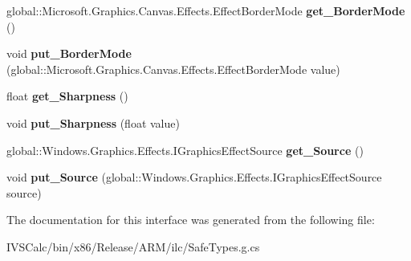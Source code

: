 \begin{DoxyCompactItemize}
global\+::\+Microsoft.\+Graphics.\+Canvas.\+Effects.\+Effect\+Border\+Mode {\bfseries get\+\_\+\+Border\+Mode} ()
\item 
\mbox{\label{interface_microsoft_1_1_graphics_1_1_canvas_1_1_effects_1_1_i_scale_effect_a56c46fac62fdf0f627612c3363b495f4}} 
void {\bfseries put\+\_\+\+Border\+Mode} (global\+::\+Microsoft.\+Graphics.\+Canvas.\+Effects.\+Effect\+Border\+Mode value)
\item 
\mbox{\label{interface_microsoft_1_1_graphics_1_1_canvas_1_1_effects_1_1_i_scale_effect_a76ce1ef01a06978e684a4618f550223f}} 
float {\bfseries get\+\_\+\+Sharpness} ()
\item 
\mbox{\label{interface_microsoft_1_1_graphics_1_1_canvas_1_1_effects_1_1_i_scale_effect_afab0f505adbbffee701a263c3e62fe43}} 
void {\bfseries put\+\_\+\+Sharpness} (float value)
\item 
\mbox{\label{interface_microsoft_1_1_graphics_1_1_canvas_1_1_effects_1_1_i_scale_effect_a5d893ef5b6101520f8cfba14fe6da905}} 
global\+::\+Windows.\+Graphics.\+Effects.\+I\+Graphics\+Effect\+Source {\bfseries get\+\_\+\+Source} ()
\item 
\mbox{\label{interface_microsoft_1_1_graphics_1_1_canvas_1_1_effects_1_1_i_scale_effect_ad103c9b390384b145ae6c1e98f30522e}} 
void {\bfseries put\+\_\+\+Source} (global\+::\+Windows.\+Graphics.\+Effects.\+I\+Graphics\+Effect\+Source source)
\end{DoxyCompactItemize}


The documentation for this interface was generated from the following file\+:\begin{DoxyCompactItemize}
\item 
I\+V\+S\+Calc/bin/x86/\+Release/\+A\+R\+M/ilc/Safe\+Types.\+g.\+cs\end{DoxyCompactItemize}
